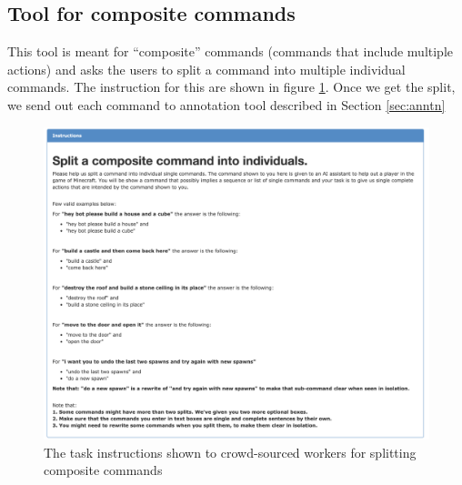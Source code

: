 \subsection{Tool for composite commands}
\label{sec:composite}
This tool is meant for ``composite'' commands (commands that include multiple actions) and asks the users to split a command into multiple individual commands. The instruction for this are shown in figure \ref{fig:comp}. Once we get the split, we send out each command to annotation tool described in Section \ref{sec:anntn}
\begin{figure}
	\includegraphics[width=\linewidth ]{figures/composite.png}
	\caption{The task instructions shown to crowd-sourced workers for splitting composite commands}
	\label{fig:comp}
\end{figure}
